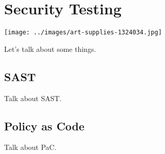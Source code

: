 \chapter{Security Testing}

\texttt{[image: ../images/art-supplies-1324034.jpg]}

Let's talk about some things. 

\section{SAST}
\justify{}
Talk about SAST.

\section{Policy as Code}
\justify{}
Talk about PaC.
